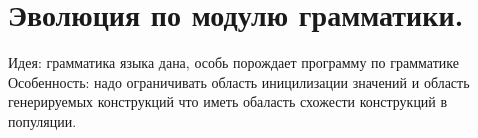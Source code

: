 \section{Эволюция по модулю грамматики.}
Идея: грамматика языка дана, особь порождает программу по грамматике
Особенность: надо ограничивать область иницилизации значений и область генерируемых конструкций что иметь обаласть схожести конструкций в популяции. 
